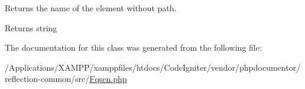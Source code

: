 Returns the name of the element without path.

\begin{DoxyReturn}{Returns}
string 
\end{DoxyReturn}


The documentation for this class was generated from the following file\+:\begin{DoxyCompactItemize}
\item 
/\+Applications/\+X\+A\+M\+P\+P/xamppfiles/htdocs/\+Code\+Igniter/vendor/phpdocumentor/reflection-\/common/src/\mbox{\hyperlink{reflection-common_2src_2_fqsen_8php}{Fqsen.\+php}}\end{DoxyCompactItemize}
